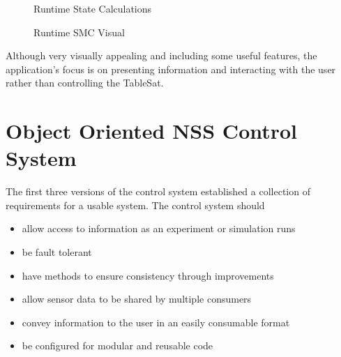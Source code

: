 \begin{figure}[H]
  \centerline{}
  \caption{Runtime State Calculations}
  \label{fig:RuntimeStateCalculations}
\end{figure}

\begin{figure}[H]
  \centerline{}
  \caption{Runtime SMC Visual}
  \label{fig:RuntimeSMCVisual}
\end{figure}

Although very visually appealing and including some useful features, the application's focus is on presenting information and interacting with the user rather than controlling the TableSat.

\section{Object Oriented NSS Control System}
\label{sec:ObjectOrientedNSSControlSystem}

The first three versions of the control system established a collection of requirements for a usable system.  The control system should

\begin{itemize}
\item allow access to information as an experiment or simulation runs
\item be fault tolerant
\item have methods to ensure consistency through improvements
\item allow sensor data to be shared by multiple consumers
\item convey information to the user in an easily consumable format
\item be configured for modular and reusable code
\end{itemize}

